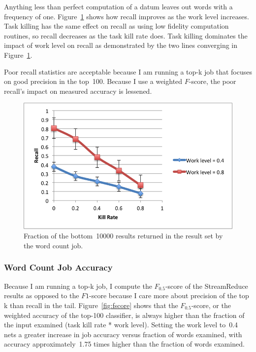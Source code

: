 \documentclass[12pt,twocolumn]{article}
\begin{document}
Anything less than perfect computation of a datum leaves out words with a frequency of one.
Figure~\ref{fig:recall} shows how recall improves as the work level increases. Task killing has
the same effect on recall as using low fidelity computation routines, so recall decreases as
the task kill rate does. Task killing dominates the impact of work level on recall as
demonstrated by the two lines converging in Figure~\ref{fig:recall}.

Poor recall statistics are acceptable because I am running a top-k job that focuses
on good precision in the top~100. Because I use a weighted $F$-score, the poor recall's
impact on measured accuracy is lessened.

\begin{figure}
\includegraphics[width=\linewidth]{recall.png}
\caption{Fraction of the bottom~10000 results returned in the result set by the word count
job.}
\label{fig:recall}
\end{figure}


\subsubsection{Word Count Job Accuracy}
Because I am running a top-k job, I compute the $F_{0.5}$-score of the StreamReduce
results as
opposed to the $F1$-score because I care more about precision of the top k than recall
in the tail. Figure~\ref{fig:fscore} shows that the $F_{0.5}$-score, or the weighted
accuracy of the top-100 classifier, is always higher than the fraction of the input
examined (task kill rate * work level). Setting the work level to~0.4 nets a greater increase
in job accuracy versus fraction of words examined, with accuracy approximately~1.75 times
higher than the fraction of words examined.
\end{document}
